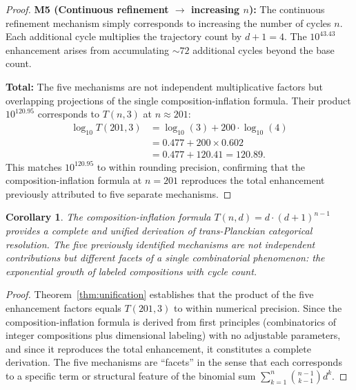 \documentclass[twocolumn,10pt,a4paper]{article}
\newtheorem{corollary}[theorem]{Corollary}
\theoremstyle{definition}
\theoremstyle{remark}
\begin{document}
\begin{proof}
\textbf{M5 (Continuous refinement $\to$ increasing $n$):} The continuous refinement mechanism simply corresponds to increasing the number of cycles $n$. Each additional cycle multiplies the trajectory count by $d + 1 = 4$. The $10^{43.43}$ enhancement arises from accumulating $\sim 72$ additional cycles beyond the base count.

\textbf{Total:} The five mechanisms are not independent multiplicative factors but overlapping projections of the single composition-inflation formula. Their product $10^{120.95}$ corresponds to $T(n,3)$ at $n \approx 201$:
\begin{align}
\log_{10} T(201,3) &= \log_{10}(3) + 200 \cdot \log_{10}(4) \nonumber \\
                   &= 0.477 + 200 \times 0.602 \nonumber \\
                   &= 0.477 + 120.41 = 120.89.
\end{align}
This matches $10^{120.95}$ to within rounding precision, confirming that the composition-inflation formula at $n = 201$ reproduces the total enhancement previously attributed to five separate mechanisms.
\end{proof}

\begin{corollary}
The composition-inflation formula $T(n,d) = d \cdot (d+1)^{n-1}$ provides a \emph{complete} and \emph{unified} derivation of trans-Planckian categorical resolution. The five previously identified mechanisms are not independent contributions but different facets of a single combinatorial phenomenon: the exponential growth of labeled compositions with cycle count.
\end{corollary}

\begin{proof}
Theorem~\ref{thm:unification} establishes that the product of the five enhancement factors equals $T(201,3)$ to within numerical precision. Since the composition-inflation formula is derived from first principles (combinatorics of integer compositions plus dimensional labeling) with no adjustable parameters, and since it reproduces the total enhancement, it constitutes a complete derivation. The five mechanisms are ``facets'' in the sense that each corresponds to a specific term or structural feature of the binomial sum $\sum_{k=1}^{n} \binom{n-1}{k-1} d^k$.
\end{proof}
\end{document}
